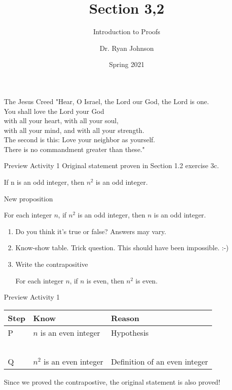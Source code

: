 \documentclass{beamer}
\title{Section 3,2}
\subtitle{Introduction to Proofs}
\author{Dr. Ryan Johnson}
\institute{Grace College}
\date{Spring 2021}
\begin{document}
\begin{frame}[plain]
    \maketitle
\end{frame}

\begin{frame}{The Jesus Creed}
\Large{
"Hear, O Israel, the Lord our God, the Lord is one.\\
You shall love the Lord your God\\
\;\; with all your heart, with all your soul,\\
\;\; with all your mind, and with all your strength.\\
The second is this: Love your neighbor as yourself.\\
There is no commandment greater than these."
}
\end{frame}

\begin{frame}{Preview Activity 1}
    Original statement proven in Section 1.2 exercise 3c. \par
    If n is an odd integer, then $n^2$ is an odd integer.\par
    New proposition \par
    For each integer $n$, if $n^2$ is an odd integer, then $n$ is an odd integer. \par
    \begin{enumerate}
    \pause
        \item Do you think it's true or false? \pause \;\; Answers may vary. \pause
        \item Know-show table.  \pause \;\; Trick question.  This should have been impossible. :-) \pause
        \item Write the contrapositive \pause \par
        For each integer $n$, if $n$ is even, then $n^2$ is even.
    \end{enumerate}
\end{frame}

\begin{frame}{Preview Activity 1}
    \begin{tabular}{| l | l | l |}
        \hline
        Step & Know & Reason \\ \hline
        P & $n$ is an even integer & Hypothesis \\ \hline
        & & \\ \hline
        & & \\ \hline
        & & \\ \hline
        & & \\ \hline
        & & \\ \hline
        Q & $n^2$ is an even integer & Definition of an even integer \\ \hline
    \end{tabular}
    \pause
    
    Since we proved the contrapostive, the original statement is also proved!
\end{frame}
\end{document}
